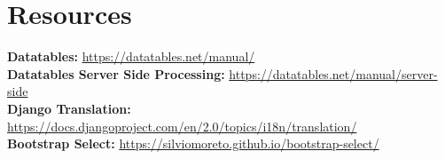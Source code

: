 \documentclass{article}
\begin{document}
\section{Resources}
\textbf{Datatables:} \url{https://datatables.net/manual/}
\\\textbf{Datatables Server Side Processing:} \url{https://datatables.net/manual/server-side}
\\\textbf{Django Translation:} \url{https://docs.djangoproject.com/en/2.0/topics/i18n/translation/}
\\\textbf{Bootstrap Select:} \url{https://silviomoreto.github.io/bootstrap-select/}
\end{document}
